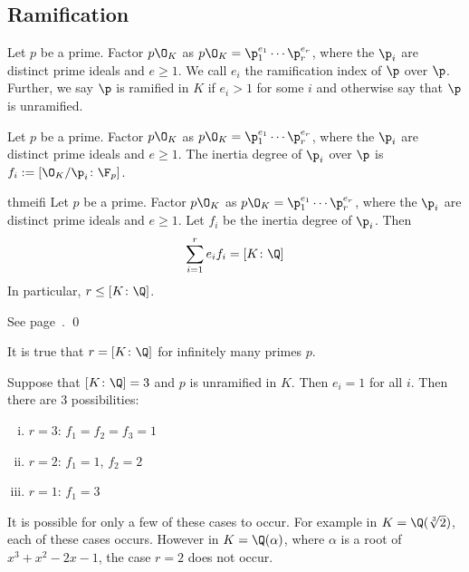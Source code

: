 \subsection{Ramification}


\begin{dfn}[Ramification]
Let $p$ be a prime. Factor $p\O_K$ as $p\O_K= \p_1^{e_1}\cdots \p_r^{e_r}$, where the $\p_i$ are distinct prime ideals and $e \geq 1$. We call $e_i$ the ramification index of $\p$ over $\p$. Further, we say $\p$ is ramified in $K$ if $e_i>1$ for some $i$ and otherwise say that $\p$ is unramified. 
\end{dfn}

\begin{dfn}
Let $p$ be a prime. Factor $p\O_K$ as $p\O_K= \p_1^{e_1}\cdots \p_r^{e_r}$, where the $\p_i$ are distinct prime ideals and $e \geq 1$. The inertia degree of $\p_i$ over $\p$ is $f_i:= [\O_K/\p_i \colon \F_p]$.
\end{dfn}

\begin{restatable}{thm}{eifi} \label{thm:eifi}
Let $p$ be a prime. Factor $p\O_K$ as $p\O_K= \p_1^{e_1}\cdots \p_r^{e_r}$, where the $\p_i$ are distinct prime ideals and $e \geq 1$. Let $f_i$ be the inertia degree of $\p_i$. Then
	\[
	\sum_{i=1}^r e_if_i = [K \colon \Q]
	\]
In particular, $r \leq [K \colon \Q]$. 
\end{restatable}

\pf See page~\pageref{firstpageref}. \qed \\

\begin{rem}
It is true that $r=[K \colon \Q]$ for infinitely many primes $p$.
\end{rem}

\begin{ex}
Suppose that $[K \colon \Q]=3$ and $p$ is unramified in $K$. Then $e_i=1$ for all $i$. Then there are 3 possibilities:
	\begin{enumerate}[(i)]
	\item $r=3$: $f_1=f_2=f_3=1$
	\item $r=2$: $f_1=1$, $f_2=2$
	\item $r=1$: $f_1=3$
	\end{enumerate}
It is possible for only a few of these cases to occur. For example in $K=\Q(\sqrt[3]{2})$, each of these cases occurs. However in $K=\Q(\alpha)$, where $\alpha$ is a root of $x^3+x^2-2x-1$, the case $r=2$ does not occur. \xqed
\end{ex}

